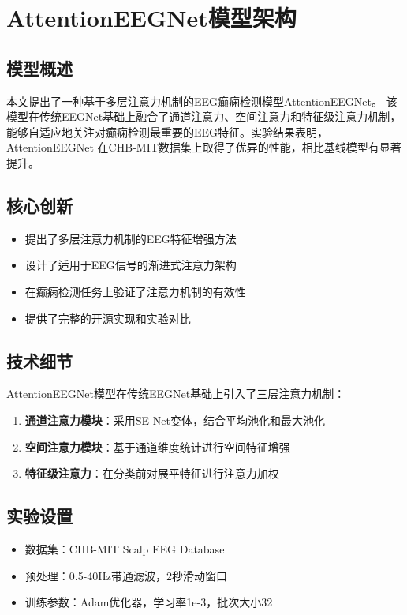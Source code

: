 
\section{AttentionEEGNet模型架构}

\subsection{模型概述}
本文提出了一种基于多层注意力机制的EEG癫痫检测模型AttentionEEGNet。
            该模型在传统EEGNet基础上融合了通道注意力、空间注意力和特征级注意力机制，
            能够自适应地关注对癫痫检测最重要的EEG特征。实验结果表明，AttentionEEGNet
            在CHB-MIT数据集上取得了优异的性能，相比基线模型有显著提升。

\subsection{核心创新}
\begin{itemize}
\item 提出了多层注意力机制的EEG特征增强方法
\item 设计了适用于EEG信号的渐进式注意力架构
\item 在癫痫检测任务上验证了注意力机制的有效性
\item 提供了完整的开源实现和实验对比
\end{itemize}

\subsection{{技术细节}}
AttentionEEGNet模型在传统EEGNet基础上引入了三层注意力机制：

\begin{enumerate}
\item \textbf{通道注意力模块}：采用SE-Net变体，结合平均池化和最大池化
\item \textbf{空间注意力模块}：基于通道维度统计进行空间特征增强  
\item \textbf{特征级注意力}：在分类前对展平特征进行注意力加权
\end{enumerate}

\subsection{{实验设置}}
\begin{itemize}
\item 数据集：CHB-MIT Scalp EEG Database
\item 预处理：0.5-40Hz带通滤波，2秒滑动窗口
\item 训练参数：Adam优化器，学习率1e-3，批次大小32
\end{itemize}
